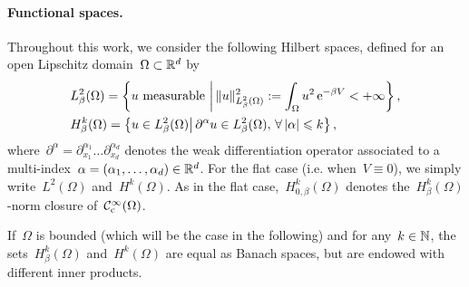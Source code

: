         \paragraph{Functional spaces.}
                Throughout this work, we consider the following Hilbert spaces, defined for an open Lipschitz domain~$\Omega\subset \mathbb{R}^d$ by
                    \begin{equation}
                        \label{03:eq:sobolev_spaces}
                        \begin{aligned}
                        &L_\beta^2(\Omega) = \left\{u\text{ measurable }\middle|\,\|u\|^2_{L_\beta^2(\Omega)} :=\int_{\Omega} u^2 \,\mathrm{e}^{-\beta V} < +\infty\right\},\\
                        &H^{k}_\beta(\Omega) = \left\{u\in L_\beta^2(\Omega)\middle|\,\partial^{\alpha}u\in L_\beta^2(\Omega),\,\forall\, |\alpha|\leqslant k\right\},
                        \end{aligned}
                    \end{equation}
                    where~$\partial^\alpha = \partial_{x_1}^{\alpha_1}\dots\partial_{x_d}^{\alpha_d}$ denotes the weak differentiation operator associated to a multi-index~$\alpha = (\alpha_1,\dots,\alpha_d)\in \mathbb{R}^d$. For the flat case (i.e. when~$V\equiv 0$), we simply write~$L^2(\Omega)$ and~$H^k(\Omega)$. As in the flat case,~$H_{0,\beta}^k(\Omega)$ denotes the~$H_\beta^k(\Omega)$-norm closure of~$\mathcal{C}^\infty_{\mathrm{c}}(\Omega)$.

                    If~$\Omega$ is bounded (which will be the case in the following) and for any~$k\in\mathbb{N}$, the sets~$H^{k}_\beta(\Omega)$ and~$H^{k}(\Omega)$ are equal as Banach spaces, but are endowed with different inner products.
